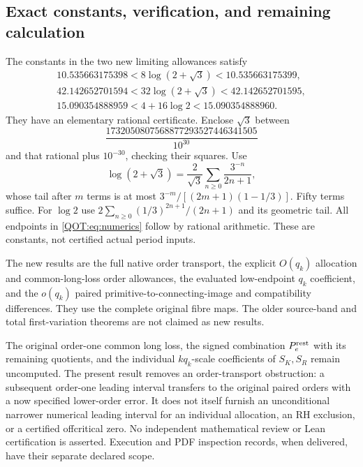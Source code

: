\documentclass[11pt,a4paper]{article}
\begin{document}
\subsection{Exact constants, verification, and remaining calculation}
The constants in the two new limiting allowances satisfy
\begin{equation}
\begin{gathered}
 10.535663175398<8\log(2+\sqrt3)<10.535663175399,\\
 42.142652701594<32\log(2+\sqrt3)<42.142652701595,\\
 15.090354888959<4+16\log2<15.090354888960.
\end{gathered}\label{QOT:eq:numerics}
\tag{QOT40}
\end{equation}
They have an elementary rational certificate. Enclose $\sqrt3$ between
\[\frac{1732050807568877293527446341505}{10^{30}}\] and that rational plus $10^{-30}$, checking their squares. Use
\[
 \log(2+\sqrt3)=\frac2{\sqrt3}\sum_{n\ge0}\frac{3^{-n}}{2n+1},
\]
whose tail after $m$ terms is at most $3^{-m}/[(2m+1)(1-1/3)]$. Fifty terms suffice. For $\log2$ use $2\sum_{n\ge0}(1/3)^{2n+1}/(2n+1)$ and its geometric tail. All endpoints in \eqref{QOT:eq:numerics} follow by rational arithmetic. These are constants, not certified actual period inputs.

The new results are the full native order transport, the explicit $O(q_k)$ allocation and common-long-loss order allowances, the evaluated low-endpoint $q_k$ coefficient, and the $o(q_k)$ paired primitive-to-connecting-image and compatibility differences. They use the complete original fibre maps. The older source-band and total first-variation theorems are not claimed as new results.

The original order-one common long loss, the signed combination $P_e^{\rm rest}$ with its remaining quotients, and the individual $kq_k$-scale coefficients of $S_K,S_R$ remain uncomputed. The present result removes an order-transport obstruction: a subsequent order-one leading interval transfers to the original paired orders with a now specified lower-order error. It does not itself furnish an unconditional narrower numerical leading interval for an individual allocation, an RH exclusion, or a certified offcritical zero. No independent mathematical review or Lean certification is asserted. Execution and PDF inspection records, when delivered, have their separate declared scope.


\clearpage
\begingroup
\end{document}
